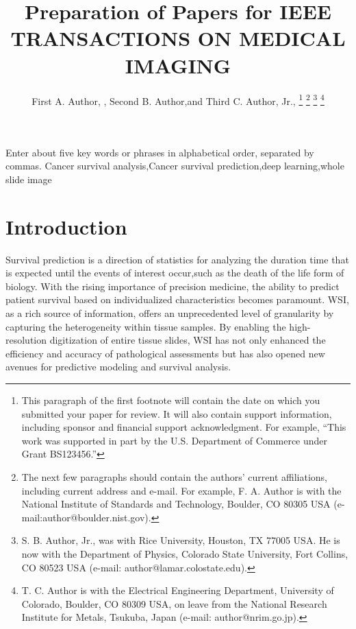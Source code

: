 \documentclass[journal,twoside,web]{ieeecolor}
\begin{document}
\title{Preparation of Papers for IEEE TRANSACTIONS ON MEDICAL IMAGING}
\author{First A. Author, , Second B. Author,and Third C. Author, Jr., 
\thanks{This paragraph of the first footnote will contain the date on which
you submitted your paper for review. It will also contain support information,
including sponsor and financial support acknowledgment. For example, 
``This work was supported in part by the U.S. Department of Commerce under Grant BS123456.'' }
\thanks{The next few paragraphs should contain the authors' current affiliations,
including current address and e-mail. For example, F. A. Author is with the
National Institute of Standards and Technology, Boulder, CO 80305 USA (e-mail:author@boulder.nist.gov). }
\thanks{S. B. Author, Jr., was with Rice University, Houston, TX 77005 USA.
He is now with the Department of Physics, Colorado State University,
Fort Collins, CO 80523 USA (e-mail: author@lamar.colostate.edu).}
\thanks{T. C. Author is with the Electrical Engineering Department,
University of Colorado, Boulder, CO 80309 USA, on leave from the National
Research Institute for Metals, Tsukuba, Japan (e-mail: author@nrim.go.jp).}}

\maketitle

\begin{abstract}

\end{abstract}

\begin{IEEEkeywords}


Enter about five key words or phrases in alphabetical order, separated by commas.
Cancer survival analysis,Cancer survival prediction,deep learning,whole slide image
\end{IEEEkeywords}

\section{Introduction}
\label{sec:introduction}


Survival prediction is a direction of statistics for analyzing the duration time that is expected until the events of interest occur,such as the death of the life form of biology.
With the rising importance of precision medicine, the ability to predict patient survival based on individualized characteristics becomes paramount.  WSI, as a rich source of information, offers an unprecedented level of granularity by capturing the heterogeneity within tissue samples. By enabling the high-resolution digitization of entire tissue slides, WSI has not only enhanced the efficiency and accuracy of pathological assessments but has also opened new avenues for predictive modeling and survival analysis.
\end{document}
